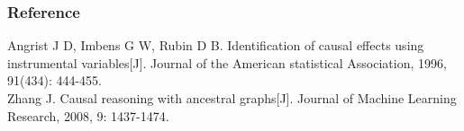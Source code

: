 \documentclass{beamer}
\begin{document}
\begin{frame}
    \frametitle{Reference} 
    Angrist J D, Imbens G W, Rubin D B. Identification of causal effects using instrumental variables[J]. 
    Journal of the American statistical Association, 1996, 91(434): 444-455. \\
    Zhang J. Causal reasoning with ancestral graphs[J]. Journal of Machine Learning Research, 2008, 9: 1437-1474. \\
\end{frame}
\end{document}
